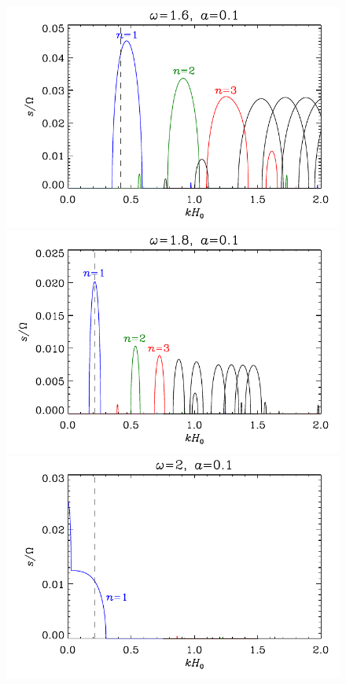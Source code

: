 \documentclass[fleqn,usenatbib]{mnras}
\begin{document}
\begin{figure}
\\
\includegraphics[scale=0.45]{Figures/results_floquet_omega1p6_a0p1.pdf}
\includegraphics[scale=0.45]{Figures/results_floquet_omega1p8_a0p1.pdf}
\includegraphics[scale=0.45]{Figures/results_floquet_omega2p0_a0p1.pdf}

\end{figure}
\end{document}

